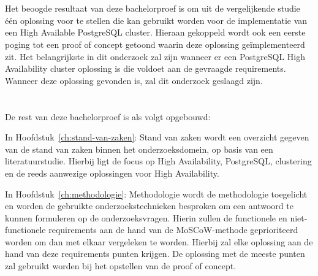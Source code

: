 \section{}
\label{sec:onderzoeksdoelstelling}

Het beoogde resultaat van deze bachelorproef is om uit de vergelijkende studie één oplossing voor te stellen die kan gebruikt worden voor de implementatie van een High Available PostgreSQL cluster. Hieraan gekoppeld wordt ook een eerste poging tot een proof of concept getoond waarin deze oplossing geïmplementeerd zit. Het belangrijkste in dit onderzoek zal zijn wanneer er een PostgreSQL High Availability cluster oplossing is die voldoet aan de gevraagde requirements. Wanneer deze oplossing gevonden is, zal dit onderzoek geslaagd zijn.


\section{}
\label{sec:opzet-bachelorproef}


De rest van deze bachelorproef is als volgt opgebouwd:

In Hoofdstuk~\ref{ch:stand-van-zaken}: Stand van zaken wordt een overzicht gegeven van de stand van zaken binnen het onderzoeksdomein, op basis van een literatuurstudie. Hierbij ligt de focus op High Availability, PostgreSQL, clustering en de reeds aanwezige oplossingen voor High Availability.

In Hoofdstuk~\ref{ch:methodologie}: Methodologie wordt de methodologie toegelicht en worden de gebruikte onderzoekstechnieken besproken om een antwoord te kunnen formuleren op de onderzoeksvragen. Hierin zullen de functionele en niet-functionele requirements aan de hand van de MoSCoW-methode geprioriteerd worden om dan met elkaar vergeleken te worden. Hierbij zal elke oplossing aan de hand van deze requirements punten krijgen. De oplossing met de meeste punten zal gebruikt worden bij het opstellen van de proof of concept.

